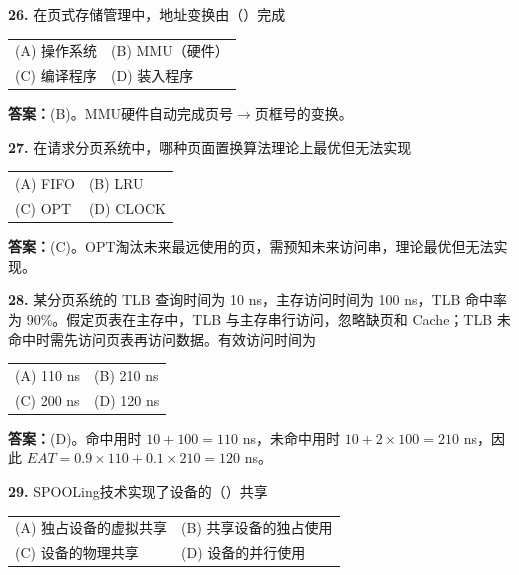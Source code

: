 \noindent\textbf{26.} 在页式存储管理中，地址变换由（\quad）完成
\begin{center}
\begin{tabular}{ll}
(A) 操作系统 & (B) MMU（硬件）\\[6pt]
(C) 编译程序 & (D) 装入程序
\end{tabular}
\end{center}

\ifshowsolutions\par\noindent\textbf{答案：}(B)。MMU硬件自动完成页号$\to$页框号的变换。\else \answerarea \fi

\vspace{6pt}

\noindent\textbf{27.} 在请求分页系统中，哪种页面置换算法理论上最优但无法实现
\begin{center}
\begin{tabular}{ll}
(A) FIFO & (B) LRU \\[6pt]
(C) OPT & (D) CLOCK
\end{tabular}
\end{center}

\ifshowsolutions\par\noindent\textbf{答案：}(C)。OPT淘汰未来最远使用的页，需预知未来访问串，理论最优但无法实现。\else \answerarea \fi

\vspace{6pt}

\noindent\textbf{28.} 某分页系统的 TLB 查询时间为 10 ns，主存访问时间为 100 ns，TLB 命中率为 90\%。假定页表在主存中，TLB 与主存串行访问，忽略缺页和 Cache；TLB 未命中时需先访问页表再访问数据。有效访问时间为
\begin{center}
\begin{tabular}{ll}
(A) 110 ns & (B) 210 ns \\[6pt]
(C) 200 ns & (D) 120 ns
\end{tabular}
\end{center}

\ifshowsolutions\par\noindent\textbf{答案：}(D)。命中用时 $10+100=110$ ns，未命中用时 $10+2\times100=210$ ns，因此 $EAT=0.9\times110+0.1\times210=120$ ns。\else \answerarea \fi

\vspace{6pt}

\noindent\textbf{29.} SPOOLing技术实现了设备的（\quad）共享
\begin{center}
\begin{tabular}{ll}
(A) 独占设备的虚拟共享 & (B) 共享设备的独占使用 \\[6pt]
(C) 设备的物理共享 & (D) 设备的并行使用
\end{tabular}
\end{center}

